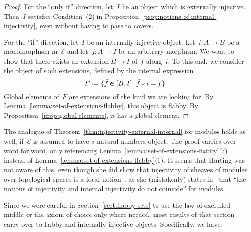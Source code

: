 \documentclass[oneside]{amsart}
\theoremstyle{definition}
\theoremstyle{plain}
\theoremstyle{remark}
\newcommand{\E}{\mathcal{E}}
\newcommand{\defeq}{\vcentcolon=}
\renewcommand{\_}{\mathpunct{.}\,}
\begin{document}
\begin{proof}For the ``only if'' direction, let~$I$ be an object
which is externally injective. Then~$I$ satisfies Condition~(2) in
Proposition~\ref{prop:notions-of-internal-injectivity}, even without having to
pass to covers.

For the ``if'' direction, let~$I$ be an internally
injective object. Let~$i : A \to B$ be a monomorphism in~$\E$ and let~$f :
A \to I$ be an arbitrary morphism. We want to show that there exists an
extension $B \to I$ of~$f$ along~$i$. To this end, we consider the object of
such extensions, defined by the internal expression
\[ F \defeq \{ \bar{f} \in [B,I] \,|\, \bar{f} \circ i = f \}. \]
Global elements of~$F$ are extensions of the kind we are looking for.
By Lemma~\ref{lemma:set-of-extensions-flabby}, this object is flabby.
By Proposition~\ref{prop:global-elements}, it has a global element.
\end{proof}

The analogue of Theorem~\ref{thm:injectivity-external-internal} for modules
holds as well, if~$\E$ is assumed to have a natural numbers object. The proof
carries over word for word, only referencing
Lemma~\ref{lemma:set-of-extensions-flabby}(2) instead of
Lemma~\ref{lemma:set-of-extensions-flabby}(1).
It seems that Harting was not aware of this, even though she did show that
injectivity of sheaves of modules over topological spaces is a local
notion~\cite{XXX}, as she
(mistakenly) states in~\cite[page~233]{harting:remark} that ``the notions of
injectivity and internal injectivity do not coincide'' for modules.

Since we were careful in Section~\ref{sect:flabby-sets} to use the law of
excluded middle or the axiom of choice only where needed, most results of that
section carry over to flabby and internally injective objects. Specifically, we
have:
\end{document}

